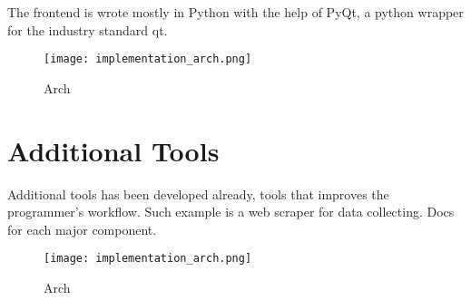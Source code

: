     The frontend is wrote mostly in Python with the help of PyQt, a python wrapper for the industry standard qt.

    \begin{figure}
      \begin{center}
        \texttt{[image: implementation\_arch.png]}
      \caption{Arch}
      \end{center}
    \end{figure}
    \pagebreak

  \section*{Additional Tools}

    Additional tools has been developed already, tools that improves the programmer's workflow.
    Such example is a web scraper for data collecting.
    Docs for each major component.
    \begin{figure}
      \begin{center}
        \texttt{[image: implementation\_arch.png]}
      \caption{Arch}
      \end{center}
    \end{figure}
    \pagebreak
